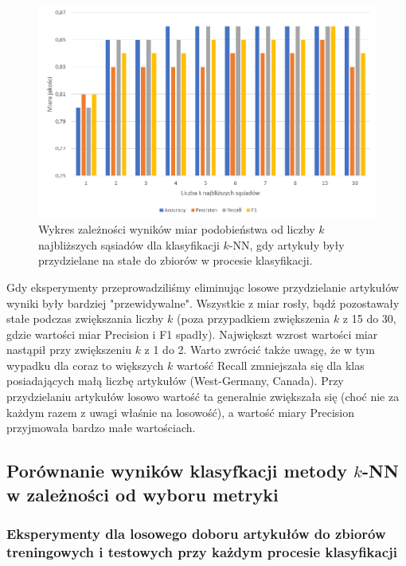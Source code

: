 \documentclass{classrep}
\begin{document}
\begin{figure}[H]
    \centering
    \includegraphics[width=14cm]{wykres_k_const.png}
    \caption{Wykres zależności wyników miar podobieństwa od liczby $k$ najbliższych sąsiadów dla klasyfikacji $k$-NN, gdy artykuły były przydzielane na stałe do zbiorów w procesie klasyfikacji.}
    \label{wykres:k_stale}
\end{figure}

Gdy eksperymenty przeprowadziliśmy eliminując losowe przydzielanie artykułów wyniki były bardziej "przewidywalne". Wszystkie z miar rosły, bądź pozostawały stałe podczas zwiększania liczby $k$ (poza przypadkiem zwiększenia $k$ z 15 do 30, gdzie wartości miar Precision i F1 spadły). Największt wzrost wartości miar nastąpił przy zwiększeniu $k$ z 1 do 2. Warto zwrócić także uwagę, że w tym wypadku dla coraz to większych $k$ wartość Recall zmniejszała się dla klas posiadających małą liczbę artykułów (West-Germany, Canada). Przy przydzielaniu artykułów losowo wartość ta generalnie zwiększała się (choć nie za każdym razem z uwagi właśnie na losowość), a wartość miary Precision przyjmowała bardzo małe wartościach.


\subsection{Porównanie wyników klasyfkacji metody $k$-NN w zależności od wyboru metryki}

\subsubsection{Eksperymenty dla losowego doboru artykułów do zbiorów treningowych i testowych przy każdym procesie klasyfikacji}
\end{document}
